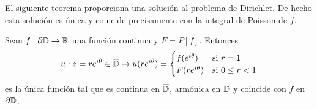 El siguiente teorema proporciona una solución al problema de Dirichlet. De hecho esta solución es única y coincide precisamente con la integral de Poisson de $f$. \\

\begin{theorem}
    \label{th:fatouaux2}
    Sean $f:\partial \mathbb{D} \to \mathbb{R}$ una función continua y $F = P[f]$. Entonces
    \begin{equation*}
        u : z = re^{i \theta} \in \overline{\mathbb{D}} \mapsto u(re^{i \theta}) =
        \begin{cases}
            f(e^{i\theta}) & \text{si } r=1 \\
            F(re^{i\theta}) & \text{si } 0 \leq r<1
        \end{cases}
    \end{equation*}
    es la única función tal que es continua en $\overline{\mathbb{D}}$, armónica en $\mathbb{D}$ y coincide con $f$ en $\partial \mathbb{D}$.
\end{theorem}

